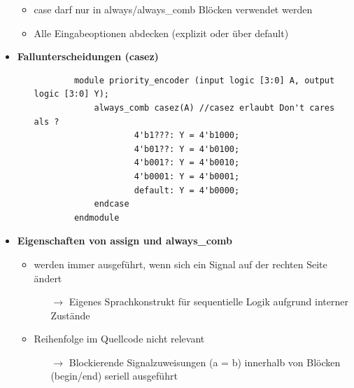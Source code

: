 \documentclass[11pt,a4paper]{article}
\begin{document}
\begin{itemize}
\begin{itemize}
	\item case darf nur in always/always\_comb Blöcken verwendet werden
	\item Alle Eingabeoptionen abdecken (explizit oder über default)
	\end{itemize}

\item \textbf{Fallunterscheidungen (casez)}
	\begin{itemize}
	\item[]
		\begin{lstlisting}
		module priority_encoder (input logic [3:0] A, output logic [3:0] Y);
			always_comb casez(A) //casez erlaubt Don't cares als ?
					4'b1???: Y = 4'b1000;
					4'b01??: Y = 4'b0100;
					4'b001?: Y = 4'b0010;
					4'b0001: Y = 4'b0001;
					default: Y = 4'b0000;
			endcase
		endmodule
		\end{lstlisting}
	\end{itemize}

\item \textbf{Eigenschaften von assign und always\_comb}
	\begin{itemize}
	\item werden immer ausgeführt, wenn sich ein Signal auf der rechten Seite ändert
		\begin{itemize}
		\item[$\rightarrow$] Eigenes Sprachkonstrukt für sequentielle Logik aufgrund interner Zustände
		\end{itemize}
		
	\item Reihenfolge im Quellcode nicht relevant
		\begin{itemize}
		\item[$\rightarrow$] Blockierende Signalzuweisungen (a = b) innerhalb von Blöcken (begin/end) seriell ausgeführt
		\end{itemize}
	\end{itemize}

\end{itemize}
\end{document}
